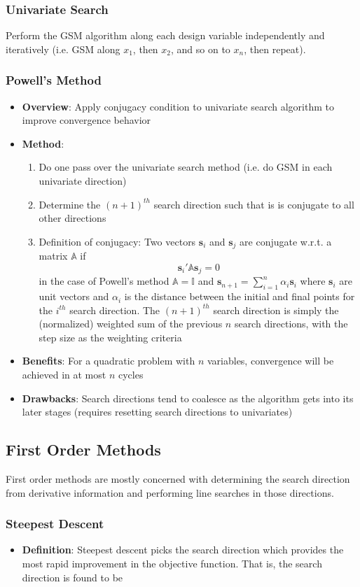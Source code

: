 \documentclass[11pt]{article}
\newcommand{\Item}[1]{\item \textbf{#1}:}
\newcommand{\CenteredBoxed}[1]{\begin{center}\boxed{#1}\end{center}}
\newcommand{\sumlim}[2]{\sum\limits_{#1}^{#2}}
\newcommand{\boldx}{\mathbf{x}}
\begin{document}
\subsubsection{Univariate Search}
Perform the GSM algorithm along each design variable independently and iteratively (i.e. GSM along $x_1$, then $x_2$, and so on to $x_n$, then repeat).
\subsubsection{Powell's Method}
\begin{itemize}
\Item{Overview} Apply conjugacy condition to univariate search algorithm to improve convergence behavior
\Item{Method}
	\begin{enumerate}
	\item Do one pass over the univariate search method (i.e. do GSM in each univariate direction)
	\item Determine the $(n+1)^{th}$ search direction such that is is conjugate to all other directions
	\item Definition of conjugacy: Two vectors $\mathbf{s}_i$ and $\mathbf{s}_j$ are conjugate w.r.t. a matrix $\mathbb{A}$ if
	$$\mathbf{s}_i'\mathbb{A}\mathbf{s}_j=0$$
	in the case of Powell's method $\mathbb{A}=\mathbb{I}$ and $\mathbf{s}_{n+1}=\sumlim{i=1}{n}\alpha_i\mathbf{s}_i$ where $\mathbf{s}_i$ are unit vectors and $\alpha_i$ is the distance between the initial and final points for the $i^{th}$ search direction. The $(n+1)^{th}$ search direction is simply the (normalized) weighted sum of the previous $n$ search directions, with the step size as the weighting criteria
	\end{enumerate}
\Item{Benefits} For a quadratic problem with $n$ variables, convergence will be achieved in at most $n$ cycles
\Item{Drawbacks} Search directions tend to coalesce as the algorithm gets into its later stages (requires resetting search directions to univariates)
\end{itemize}

\subsection{First Order Methods}
First order methods are mostly concerned with determining the search direction from derivative information and performing line searches in those directions.
\subsubsection{Steepest Descent}
\begin{itemize}
\Item{Definition} Steepest descent picks the search direction which provides the most rapid improvement in the objective function. That is, the search direction is found to be
\CenteredBoxed{\mathbf{s}_k=\frac{-\nabla f(\boldx_{k-1})}{\|f(\boldx_{k-1})\|}}
\end{itemize}
\end{document}
